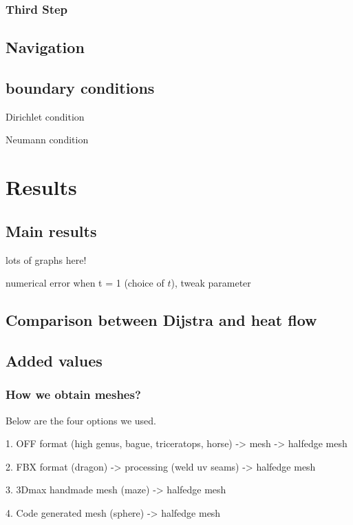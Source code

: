 \documentclass[a4paper,12pt,twoside]{article}
\begin{document}
\subsubsection{Third Step}


\subsection{Navigation}



\subsection{boundary conditions}
Dirichlet condition

Neumann condition

\section{Results}

\subsection{Main results}
lots of graphs here!

numerical error when t = 1 (choice of $t$), tweak parameter

\subsection{Comparison between Dijstra and heat flow}

\subsection{Added values}

\subsubsection{How we obtain meshes?}
Below are the four options we used.

1. OFF format (high genus, bague, triceratops, horse) -> mesh -> halfedge mesh

2. FBX format (dragon) -> processing (weld uv seams) -> halfedge mesh

3. 3Dmax handmade mesh (maze) -> halfedge mesh

4. Code generated mesh (sphere) -> halfedge mesh
\end{document}
